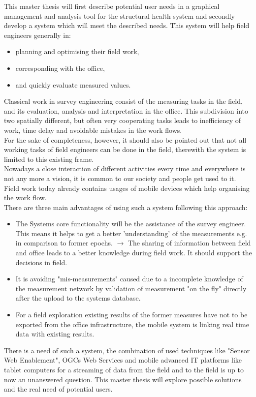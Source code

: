 This master thesis will first describe potential user needs in a graphical management and analysis tool for the structural health system and secondly develop a system which will meet the described needs. This system will help field engineers generally in:
\begin{itemize}
\item planning and optimising their field work,
\item corresponding with the office,
\item and quickly evaluate measured values.
\end{itemize}
Classical work in survey engineering consist of the measuring tasks in the field, and its evaluation, analysis and interpretation in the office. This subdivision into two spatially different, but often very cooperating tasks leads to inefficiency of work, time delay and avoidable mistakes in the work flows.\\
For the sake of completeness, however, it should also be pointed out that not all working tasks of field engineers can be done in the field, therewith the system is limited to this existing frame.\\
Nowadays a close interaction of different activities every time and everywhere is not any more a vision, it is common to our society and people get used to it. Field work today already contains usages of mobile devices which help organising the work flow.\\
There are three main advantages of using such a system following this approach:
\begin{itemize}
\item The Systems core functionality will be the assistance of the survey engineer. This means it helps to get a better 'understanding' of the measurements e.g. in comparison to former epochs. $\rightarrow$ The sharing of information between field and office leads to a better knowledge during field work. It should support the decisions in field.
\item It is avoiding "mis-measurements" caused due to a incomplete knowledge of the measurement network by validation of measurement "on the fly" directly after the upload to the systems database.
\item For a field exploration existing results of the former measures have not to be exported from the office infrastructure, the mobile system is linking real time data with existing results.
\end{itemize}
There is a need of such a system, the combination of used techniques like "Sensor Web Enablement", OGCs Web Services and mobile advanced IT platforms like tablet computers for a streaming of data from the field and to the field is up to now an unanswered question. This master thesis will explore possible solutions and the real need of potential users.\\
